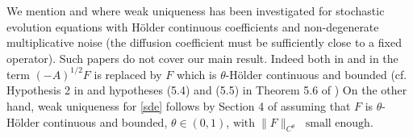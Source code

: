 \documentclass[preprint]{imsart}
\begin{document}
   
 
 
 We  mention   \cite{Za}   
  and \cite{bass1}   where  weak uniqueness has been investigated for stochastic evolution equations   
with H\"older continuous  coefficients and 
non-degenerate  multiplicative noise (the diffusion coefficient must be sufficiently close to  
a fixed operator).   
  Such papers do not cover our main result. Indeed both in \cite{Za} and  in \cite{bass1} the term $(-A)^{1/2} F$ is replaced by $F $ 
   which   is  
   $\theta$-H\"older continuous and bounded (cf.    Hypothesis 2 in \cite{Za} and hypotheses (5.4) and (5.5) in Theorem 5.6 of \cite{bass1})
   On the other hand, 
 weak uniqueness for \eqref{sde} follows by  Section 4 of  \cite{D2} assuming  that $F$ is $\theta$-H\"older continuous and bounded, $\theta \in (0,1)$,  
$
 \text{with} \; \| F\|_{C^{\theta}} \; $ $\text{small enough. }
$
     
\end{document}
